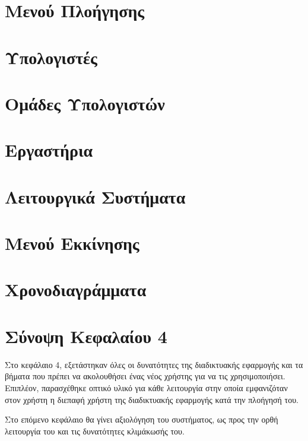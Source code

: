 \FloatBarrier

\section{Μενού Πλοήγησης}

\section{Υπολογιστές}

\section{Ομάδες Υπολογιστών}

\section{Εργαστήρια}

\section{Λειτουργικά Συστήματα}

\section{Μενού Εκκίνησης}

\section{Χρονοδιαγράμματα}

\section{Σύνοψη Κεφαλαίου 4}
Στο κεφάλαιο 4, εξετάστηκαν όλες οι δυνατότητες της διαδικτυακής εφαρμογής και τα βήματα που πρέπει να ακολουθήσει ένας νέος χρήστης για να τις χρησιμοποιήσει. Επιπλέον, παρασχέθηκε οπτικό υλικό για κάθε λειτουργία στην οποία εμφανιζόταν στον χρήστη η διεπαφή χρήστη της διαδικτυακής εφαρμογής κατά την πλοήγησή του.

Στο επόμενο κεφάλαιο θα γίνει αξιολόγηση του συστήματος, ως προς την ορθή λειτουργία του και τις δυνατότητες κλιμάκωσής του.
